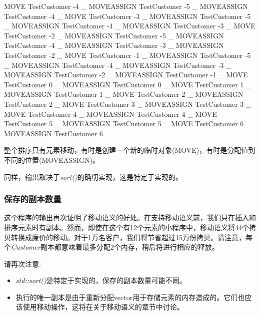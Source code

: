 \begin{shell}
MOVE TestCustomer -4 _
MOVEASSIGN TestCustomer -5 _
MOVEASSIGN TestCustomer -4 _
MOVE TestCustomer -3 _
MOVEASSIGN TestCustomer -5 _
MOVEASSIGN TestCustomer -4 _
MOVEASSIGN TestCustomer -3 _
MOVE TestCustomer -2 _
MOVEASSIGN TestCustomer -5 _
MOVEASSIGN TestCustomer -4 _
MOVEASSIGN TestCustomer -3 _
MOVEASSIGN TestCustomer -2 _
MOVE TestCustomer -1 _
MOVEASSIGN TestCustomer -5 _
MOVEASSIGN TestCustomer -4 _
MOVEASSIGN TestCustomer -3 _
MOVEASSIGN TestCustomer -2 _
MOVEASSIGN TestCustomer -1 _
MOVE TestCustomer 0 _
MOVEASSIGN TestCustomer 0 _
MOVE TestCustomer 1 _
MOVEASSIGN TestCustomer 1 _
MOVE TestCustomer 2 _
MOVEASSIGN TestCustomer 2 _
MOVE TestCustomer 3 _
MOVEASSIGN TestCustomer 3 _
MOVE TestCustomer 4 _
MOVEASSIGN TestCustomer 4 _
MOVE TestCustomer 5 _
MOVEASSIGN TestCustomer 5 _ 
MOVE TestCustomer 6 _
MOVEASSIGN TestCustomer 6 _
\end{shell}

整个排序只有元素移动，有时是创建一个新的临时对象(MOVE)，有时是分配值到不同的位置(MOVEASSIGN)。

同样，输出取决于\textit{sort()}的确切实现，这是特定于实现的。

\subsubsection{保存的副本数量}

这个程序的输出再次证明了移动语义的好处。在支持移动语义前，我们只在插入和排序元素时有副本。然而，即使在这个有12个元素的小程序中，移动语义将44个拷贝转换成廉价的移动。对于1万名客户，我们将节省超过15万份拷贝。请注意，每个\textit{Customer}副本都意味着最多分配2个内存，稍后将进行相应的释放。

请再次注意:

\begin{itemize}
	\item \textit{std::sort()}是特定于实现的，保存的副本数量可能不同。
	\item 执行的唯一副本是由于重新分配vector用于存储元素的内存造成的。它们也应该使用移动操作，这将在关于移动语义的章节中讨论。
\end{itemize}


























